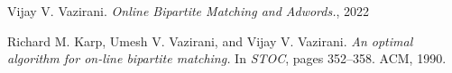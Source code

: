 \documentclass[conference,compsoc]{IEEEtran}
\begin{document}

%
%
%
\begin{thebibliography}{1}



Vijay V. Vazirani. \emph{ Online Bipartite Matching and Adwords.}, 2022

Richard M. Karp, Umesh V. Vazirani, and Vijay V. Vazirani. \emph{ An optimal algorithm for on-line bipartite matching.} \relax In \emph{STOC}, pages
352–358. ACM, 1990.

\end{thebibliography}




\end{document}
